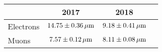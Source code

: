 \begin{table}
\noindent \centering{}
\label{sigma_align}
\begin{tabular}{l|ccc}
\hline
          & 2017      & 2018\\
\hline
Electrons & $14.75\pm0.36\,\mu\text{m}$ & $9.18\pm0.41\,\mu\text{m}$\\
Muons     & $7.57\pm0.12\,\mu\text{m}$  & $8.11\pm0.08\,\mu\text{m}$\\
\hline
\end{tabular}
\end{table}